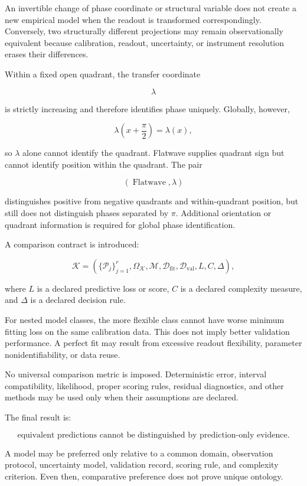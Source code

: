 \documentclass[11pt,oneside,openany]{book}
\begin{document}
An invertible change of phase coordinate or structural variable does not create a new empirical model when the readout is transformed correspondingly. Conversely, two structurally different projections may remain observationally equivalent because calibration, readout, uncertainty, or instrument resolution erases their differences.

Within a fixed open quadrant, the transfer coordinate

\[
\lambda
\]

is strictly increasing and therefore identifies phase uniquely. Globally, however,

\[
\lambda\left(x+\frac{\pi}{2}\right)=\lambda(x),
\]

so \(\lambda\) alone cannot identify the quadrant. Flatwave supplies quadrant sign but cannot identify position within the quadrant. The pair

\[
(\operatorname{Flatwave},\lambda)
\]

distinguishes positive from negative quadrants and within-quadrant position, but still does not distinguish phases separated by \(\pi\). Additional orientation or quadrant information is required for global phase identification.

A comparison contract is introduced:

\[
\mathcal K = \left( \{\mathcal P_j\}_{j=1}^{r}, \Omega_{\mathcal K}, \mathcal M, \mathcal D_{\mathrm{fit}}, \mathcal D_{\mathrm{val}}, L, C, \Delta \right),
\]

where \(L\) is a declared predictive loss or score, \(C\) is a declared complexity measure, and \(\Delta\) is a declared decision rule.

For nested model classes, the more flexible class cannot have worse minimum fitting loss on the same calibration data. This does not imply better validation performance. A perfect fit may result from excessive readout flexibility, parameter nonidentifiability, or data reuse.

No universal comparison metric is imposed. Deterministic error, interval compatibility, likelihood, proper scoring rules, residual diagnostics, and other methods may be used only when their assumptions are declared.

The final result is:

\[
\boxed{ \text{equivalent predictions cannot be distinguished by prediction-only evidence.} }
\]

A model may be preferred only relative to a common domain, observation protocol, uncertainty model, validation record, scoring rule, and complexity criterion. Even then, comparative preference does not prove unique ontology.
\end{document}
